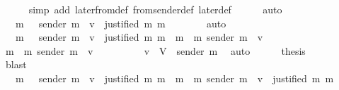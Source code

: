 \begin{isabellebody}
\ \ \ \ \isamarkupfalse%
\ {\isacharparenleft}simp\ add{\isacharcolon}\ later{\isacharunderscore}from{\isacharunderscore}def\ from{\isacharunderscore}sender{\isacharunderscore}def\ later{\isacharunderscore}def{\isacharparenright}\isanewline
\ \ \ \ \isamarkupfalse%
\ auto\isanewline
\ \ \isamarkupfalse%
\ \isamarkupfalse%
\ {\isachardoublequoteopen}{\isasymdots}\ {\isacharequal}\ {\isacharbraceleft}m{\isacharprime}{\isacharprime}\ {\isasymin}\ {\isasymsigma}{\isachardot}\ sender\ m{\isacharprime}{\isacharprime}\ {\isacharequal}\ v\ {\isasymand}\ justified\ m\ m{\isacharprime}{\isacharprime}{\isacharbraceright}\ {\isasymunion}\ {\isasymemptyset}{\isachardoublequoteclose}\isanewline
\ \ \ \ \isamarkupfalse%
\ auto\ \ \ \ \isanewline
\ \ \isamarkupfalse%
\ \isamarkupfalse%
\ {\isachardoublequoteopen}{\isasymdots}\ {\isacharequal}\ {\isacharbraceleft}m{\isacharprime}{\isacharprime}\ {\isasymin}\ {\isasymsigma}{\isachardot}\ sender\ m{\isacharprime}{\isacharprime}\ {\isacharequal}\ v\ {\isasymand}\ justified\ m\ m{\isacharprime}{\isacharprime}{\isacharbraceright}\ {\isasymunion}\ {\isacharbraceleft}m{\isacharprime}{\isacharprime}\ {\isasymin}\ {\isacharbraceleft}m{\isacharprime}{\isacharbraceright}{\isachardot}\ sender\ m{\isacharprime}{\isacharprime}\ {\isacharequal}\ v{\isacharbraceright}{\isachardoublequoteclose}\isanewline
\ \ \isamarkupfalse%
{\isacharminus}\isanewline
\ \ \ \ \isamarkupfalse%
\ {\isachardoublequoteopen}{\isacharbraceleft}m{\isacharprime}{\isacharprime}\ {\isasymin}\ {\isacharbraceleft}m{\isacharprime}{\isacharbraceright}{\isachardot}\ sender\ m{\isacharprime}{\isacharprime}\ {\isacharequal}\ v{\isacharbraceright}\ {\isacharequal}\ {\isasymemptyset}{\isachardoublequoteclose}\isanewline
\ \ \ \ \ \ \isamarkupfalse%
\ {\isacartoucheopen}v\ {\isasymin}\ V\ {\isacharminus}\ {\isacharbraceleft}sender\ m{\isacharprime}{\isacharbraceright}{\isacartoucheclose}\ \isamarkupfalse%
\ auto\isanewline
\ \ \ \ \isamarkupfalse%
\ {\isacharquery}thesis\isanewline
\ \ \ \ \ \ \isamarkupfalse%
\ blast\isanewline
\ \ \isamarkupfalse%
\isanewline
\ \ \isamarkupfalse%
\ \isamarkupfalse%
\ {\isachardoublequoteopen}{\isasymdots}\ {\isacharequal}\ {\isacharbraceleft}m{\isacharprime}{\isacharprime}\ {\isasymin}\ {\isasymsigma}{\isachardot}\ sender\ m{\isacharprime}{\isacharprime}\ {\isacharequal}\ v\ {\isasymand}\ justified\ m\ m{\isacharprime}{\isacharprime}{\isacharbraceright}\ {\isasymunion}\ {\isacharbraceleft}m{\isacharprime}{\isacharprime}\ {\isasymin}\ {\isacharbraceleft}m{\isacharprime}{\isacharbraceright}{\isachardot}\ sender\ m{\isacharprime}{\isacharprime}\ {\isacharequal}\ v\ {\isasymand}\ justified\ m\ m{\isacharprime}{\isacharprime}{\isacharbraceright}{\isachardoublequoteclose}\isanewline

\end{isabellebody}
